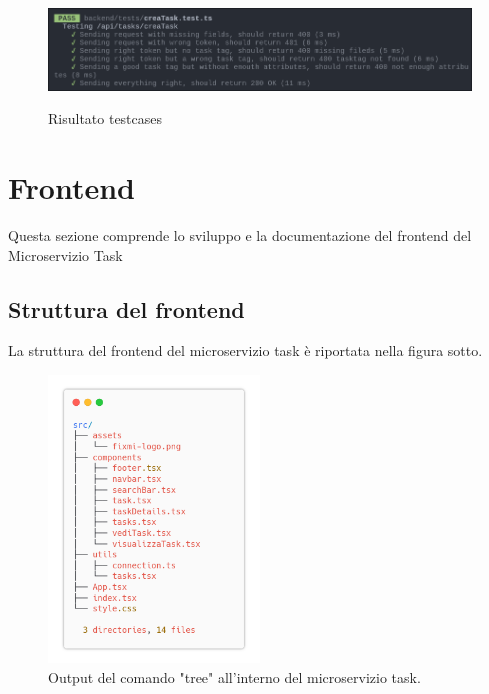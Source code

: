 \documentclass{report}
\begin{document}
\begin{figure}[H]
	\centering\includegraphics[width=1\textwidth]{images/jest_crea_task.png}

	Risultato testcases
\end{figure}

\section{Frontend}

Questa sezione comprende lo sviluppo e la documentazione del frontend del Microservizio Task

\subsection{Struttura del frontend}
La struttura del frontend del microservizio task è riportata
nella figura sotto.
\begin{figure}[H]
	\centering\includegraphics[width=0.5\textwidth]{images/microservizio-task/frontend-structure.png}
	\caption{Output del comando "tree" all'interno del microservizio task.}
\end{figure}
\end{document}
